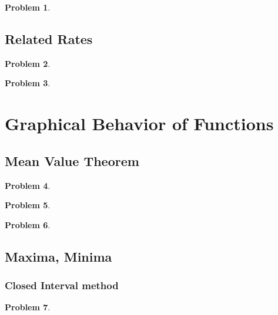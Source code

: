 \documentclass{article}
\newtheorem{problem}{Problem}
\begin{document}
\begin{problem}

\end{problem}

\subsection{Related Rates}\label{secMPSrelatedRates}
\begin{problem}

\end{problem}

\begin{problem}

\end{problem}



\section{Graphical Behavior of Functions}
\subsection{Mean Value Theorem}\label{secMPS-MVT}

\begin{problem}

\end{problem}


\begin{problem}

\end{problem}

\begin{problem}

\end{problem}



\subsection{Maxima, Minima}\label{secMPSoneVariableMinMax}
\subsubsection{Closed Interval method}\label{secMPSclosedInterval}
\begin{problem}

\end{problem}
\end{document}

